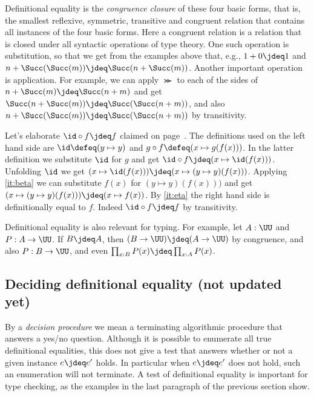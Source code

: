Definitional equality is the \emph{congruence closure} of these 
four basic forms, that is, the smallest reflexive, symmetric, transitive
and congruent relation that contains all instances of the four basic forms.
Here a congruent relation is a relation that is closed under all syntactic
operations of type theory. One such operation is substitution, so that we
get from the examples above that, e.g., $1+0 \jdeq 1$ 
and $n+\Succ(\Succ(m)) \jdeq \Succ(n+\Succ(m))$. Another important
operation is application. For example, we can apply $\Succ$ to each of
the sides of $n+\Succ(m) \jdeq \Succ(n+m)$ and get 
$\Succ(n+\Succ(m)) \jdeq \Succ(\Succ(n+m))$, and also
$n+\Succ(\Succ(m)) \jdeq \Succ(\Succ(n+m))$ by transitivity.

Let's elaborate $\id \circ f \jdeq f$ claimed on page~\pageref{page:idofetaf}.
The definitions used on the left hand side are 
$\id \defeq (y \mapsto y)$ and $g \circ f \defeq (x \mapsto g(f(x)))$.
In the latter definition we substitute $\id$ for $g$ and get
$\id \circ f \jdeq (x \mapsto \id(f(x)))$. Unfolding $\id$ we get
$(x \mapsto \id(f(x))) \jdeq (x \mapsto (y\mapsto y)(f(x)))$.
Applying \ref{it:beta} we can substitute $f(x)$ for $(y\mapsto y)(f(x)))$
and get $(x \mapsto (y\mapsto y)(f(x))) \jdeq (x \mapsto f(x))$.
By \ref{it:eta} the right hand side is definitionally equal to $f$.
Indeed $\id \circ f \jdeq f$ by transitivity.

Definitional equality is also relevant for typing.
For example, let $A: \UU$ and $P: A\to\UU$. If $B\jdeq A$,
then  $ (B\to\UU)\jdeq(A\to\UU)$ by congruence, and also $P: B\to\UU$,
and even $\prod_{x:B} P(x) \jdeq \prod_{x:A} P(x)$.



\subsection{Deciding definitional equality (not updated yet)}
\label{sec:defeq-computation}

By a \emph{decision procedure} we mean a terminating algorithmic procedure that 
answers a yes/no question.
Although it is possible to enumerate all true definitional equalities,
this does not give a test that answers whether or not a given instance $e\jdeq e'$ holds.
In particular when $e\jdeq e'$ does not hold, such an enumeration will not terminate.
A test of definitional equality is important for type checking,
as the examples in the last paragraph of the previous section show.

